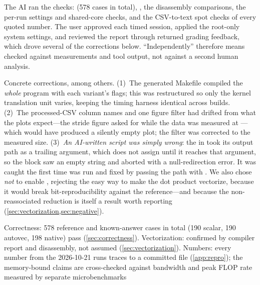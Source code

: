 \begin{description}[style=nextline]
  \item[Who verified what] The AI ran the checks:  (\num{578} cases in total), ,
        the disassembly comparisons, the per-run settings and shared-core checks, and the
        CSV-to-text spot checks of every quoted number. The user approved each timed session, applied
        the root-only system settings, and reviewed the report through returned grading feedback,
        which drove several of the corrections below. ``Independently'' therefore means checked
        against measurements and tool output, not against a second human analysis.
  \item[What was independently modified, tested, or rejected] Concrete corrections, among others.
        (1)~The generated Makefile compiled the \emph{whole} program with each variant's
        flags; this was restructured so only the kernel translation unit varies, keeping the
        timing harness identical across builds. (2)~The processed-CSV column names and one
        figure filter had drifted from what the plots expect---the stride figure asked for
         while the data was measured at ---which would have
        produced a silently empty plot; the filter was corrected to the measured size.
        (3)~\emph{An AI-written script was simply wrong}: the  in
         took its output path as a trailing 
        argument, which  does not assign until it reaches that argument, so the
         block saw an empty string and aborted with a null-redirection error. It
        was caught the first time  was run and fixed by passing the path
        with . We also chose \emph{not} to enable , rejecting the
        easy way to make the dot product vectorize, because it would break bit-reproducibility
        against the reference---and because the non-reassociated reduction is itself a result
        worth reporting (\cref{sec:vectorization,sec:negative}).
  \item[Validation] Correctness: \num{578} reference and known-answer cases in total
        (\num{190} scalar, \num{190} autovec, \num{198} native) pass (\cref{sec:correctness}).
        Vectorization: confirmed by compiler report and disassembly, not assumed
        (\cref{sec:vectorization}). Numbers: every number from the 2026-10-21 runs traces to a
        committed file (\cref{app:repro}); the memory-bound claims are
        cross-checked against bandwidth and peak FLOP rate measured by separate microbenchmarks

\end{description}
